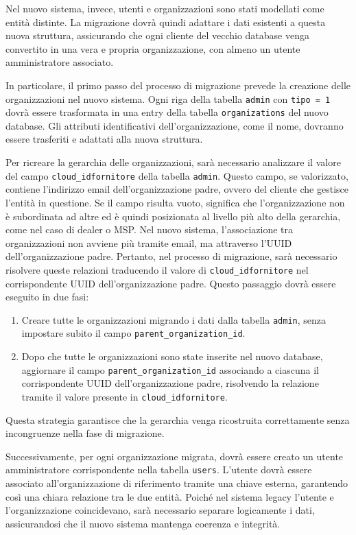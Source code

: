 Nel nuovo sistema, invece, utenti e organizzazioni sono stati modellati come entità distinte. La migrazione dovrà quindi adattare i dati esistenti a questa nuova struttura, assicurando che ogni cliente del vecchio database venga convertito in una vera e propria organizzazione, con almeno un utente amministratore associato.

In particolare, il primo passo del processo di migrazione prevede la creazione delle organizzazioni nel nuovo sistema. Ogni riga della tabella \texttt{admin} con \texttt{tipo = 1} dovrà essere trasformata in una entry della tabella \texttt{organizations} del nuovo database. Gli attributi identificativi dell’organizzazione, come il nome, dovranno essere trasferiti e adattati alla nuova struttura.

Per ricreare la gerarchia delle organizzazioni, sarà necessario analizzare il valore del campo \texttt{cloud\_idfornitore} della tabella \texttt{admin}. Questo campo, se valorizzato, contiene l’indirizzo email dell’organizzazione padre, ovvero del cliente che gestisce l’entità in questione. Se il campo risulta vuoto, significa che l'organizzazione non è subordinata ad altre ed è quindi posizionata al livello più alto della gerarchia, come nel caso di dealer o MSP.
%
Nel nuovo sistema, l'associazione tra organizzazioni non avviene più tramite email, ma attraverso l'UUID dell'organizzazione padre. Pertanto, nel processo di migrazione, sarà necessario risolvere queste relazioni traducendo il valore di \texttt{cloud\_idfornitore} nel corrispondente UUID dell'organizzazione padre. Questo passaggio dovrà essere eseguito in due fasi:
\begin{enumerate}
  \item Creare tutte le organizzazioni migrando i dati dalla tabella \texttt{admin}, senza impostare subito il campo \texttt{parent\_organization\_id}.
  \item Dopo che tutte le organizzazioni sono state inserite nel nuovo database, aggiornare il campo \texttt{parent\_organization\_id} associando a ciascuna il corrispondente UUID dell'organizzazione padre, risolvendo la relazione tramite il valore presente in \texttt{cloud\_idfornitore}.
\end{enumerate}
Questa strategia garantisce che la gerarchia venga ricostruita correttamente senza incongruenze nella fase di migrazione.

Successivamente, per ogni organizzazione migrata, dovrà essere creato un utente amministratore corrispondente nella tabella \texttt{users}. L’utente dovrà essere associato all’organizzazione di riferimento tramite una chiave esterna, garantendo così una chiara relazione tra le due entità. Poiché nel sistema legacy l'utente e l'organizzazione coincidevano, sarà necessario separare logicamente i dati, assicurandosi che il nuovo sistema mantenga coerenza e integrità.

